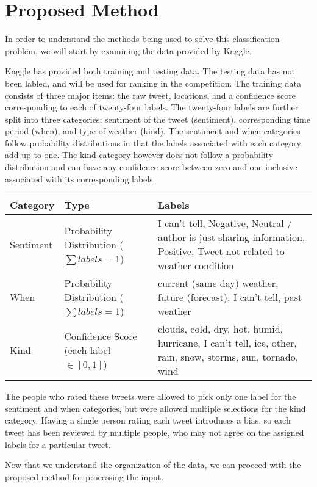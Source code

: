 \documentclass{article}
\begin{document}
\section{Proposed Method}
In order to understand the methods being used to solve this classification problem, we will start by examining the data provided by Kaggle.

Kaggle has provided both training and testing data. The testing data has not been labled, and will be used for ranking in the competition. The training data consists of three major items: the raw tweet, locations, and a confidence score corresponding to each of twenty-four labels. The twenty-four labels are further split into three categories: sentiment of the tweet (sentiment), corresponding time period (when), and type of weather (kind). The sentiment and when categories follow probability distributions in that the labels associated with each category add up to one. The kind category however does not follow a probability distribution and can have any confidence score between zero and one inclusive associated with its corresponding labels.

\begin{center}
    \begin{tabular}{ | l | p{3.7cm} | p{7.3cm} |}
    \hline
    Category & Type & Labels \\ \hline
    Sentiment & Probability Distribution ($\sum labels = 1$) & I can't tell, Negative, Neutral / author is just sharing information, Positive, Tweet not related to weather condition \\ \hline
    When & Probability Distribution ($\sum labels = 1$) & current (same day) weather, future (forecast), I can't tell, past weather \\ \hline
    Kind & Confidence Score (each label $\in [0,1]$) & clouds, cold, dry, hot, humid, hurricane, I can't tell, ice, other, rain, snow, storms, sun, tornado, wind \\ \hline
    \end{tabular}
\end{center}

The people who rated these tweets were allowed to pick only one label for the sentiment and when categories, but were allowed multiple selections for the kind category. Having a single person rating each tweet introduces a bias, so each tweet has been reviewed by multiple people, who may not agree on the assigned labels for a particular tweet. 

Now that we understand the organization of the data, we can proceed with the proposed method for processing the input.
\end{document}
